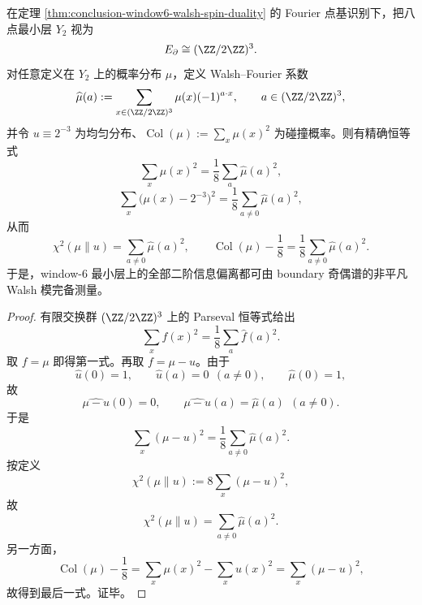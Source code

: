 \begin{proposition}\label{prop:conclusion-window6-boundary-plancherel-information-identity}
在定理 \ref{thm:conclusion-window6-walsh-spin-duality} 的 Fourier 点基识别下，把八点最小层 \(Y_2\) 视为
\[
E_{\partial}\cong (\ZZ/2\ZZ)^3.
\]
对任意定义在 \(Y_2\) 上的概率分布 \(\mu\)，定义 Walsh--Fourier 系数
\[
\widehat\mu(a):=\sum_{x\in(\ZZ/2\ZZ)^3}\mu(x)(-1)^{a\cdot x},
\qquad a\in(\ZZ/2\ZZ)^3,
\]
并令 \(u\equiv 2^{-3}\) 为均匀分布、\(\operatorname{Col}(\mu):=\sum_x\mu(x)^2\) 为碰撞概率。则有精确恒等式
\[
\sum_x \mu(x)^2
=
\frac18\sum_a \widehat\mu(a)^2,
\]
\[
\sum_x\bigl(\mu(x)-2^{-3}\bigr)^2
=
\frac18\sum_{a\neq 0}\widehat\mu(a)^2,
\]
从而
\[
\chi^2(\mu\|u)=\sum_{a\neq 0}\widehat\mu(a)^2,
\qquad
\operatorname{Col}(\mu)-\frac18
=
\frac18\sum_{a\neq 0}\widehat\mu(a)^2.
\]
于是，window-\(6\) 最小层上的全部二阶信息偏离都可由 boundary 奇偶谱的非平凡 Walsh 模完备测量。
\end{proposition}
\begin{proof}
有限交换群 \((\ZZ/2\ZZ)^3\) 上的 Parseval 恒等式给出
\[
\sum_x f(x)^2
=
\frac18\sum_a \widehat f(a)^2.
\]
取 \(f=\mu\) 即得第一式。再取 \(f=\mu-u\)。由于
\[
\widehat u(0)=1,\qquad
\widehat u(a)=0\ \ (a\neq 0),\qquad
\widehat\mu(0)=1,
\]
故
\[
\widehat{\mu-u}(0)=0,\qquad
\widehat{\mu-u}(a)=\widehat\mu(a)\ \ (a\neq 0).
\]
于是
\[
\sum_x(\mu-u)^2
=
\frac18\sum_{a\neq 0}\widehat\mu(a)^2.
\]
按定义
\[
\chi^2(\mu\|u)
:=
8\sum_x(\mu-u)^2,
\]
故
\[
\chi^2(\mu\|u)=\sum_{a\neq 0}\widehat\mu(a)^2.
\]
另一方面，
\[
\operatorname{Col}(\mu)-\frac18
=
\sum_x\mu(x)^2-\sum_xu(x)^2
=
\sum_x(\mu-u)^2,
\]
故得到最后一式。证毕。
\end{proof}

